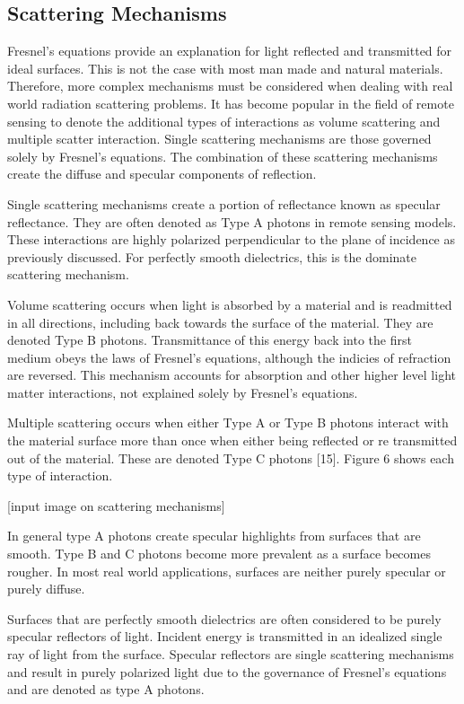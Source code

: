 \subsection{Scattering Mechanisms}

Fresnel’s equations provide an explanation for light reflected and transmitted for ideal surfaces.  This is not the case with most man made and natural materials.  Therefore, more complex mechanisms must be considered when dealing with real world radiation scattering problems.  It has become popular in the field of remote sensing to denote the additional types of interactions as volume scattering and multiple scatter interaction.  Single scattering mechanisms are those governed solely by Fresnel’s equations.  The combination of these scattering mechanisms create the diffuse and specular components of reflection.

Single scattering mechanisms create a portion of reflectance known as specular reflectance.  They are often denoted as Type A photons in remote sensing models.  These interactions are highly polarized perpendicular to the plane of incidence as previously discussed. For perfectly smooth dielectrics, this is the dominate scattering mechanism.

Volume scattering occurs when light is absorbed by a material and is readmitted in all directions, including back towards the surface of the material.  They are denoted Type B photons.  Transmittance of this energy back into the first medium obeys the laws of Fresnel’s equations, although the indicies of refraction are reversed.  This mechanism accounts for absorption and other higher level light matter interactions, not explained solely by Fresnel’s equations.

Multiple scattering occurs when either Type A or Type B photons interact with the material surface more than once when either being reflected or re transmitted out of the material.  These are denoted Type C photons [15].  Figure 6 shows each type of interaction.

[input image on scattering mechanisms]

In general type A photons create specular highlights from surfaces that are smooth.  Type B and C photons become more prevalent as a surface becomes rougher.  In most real world applications, surfaces are neither purely specular or purely diffuse.

Surfaces that are perfectly smooth dielectrics are often considered to be purely specular reflectors of light.  Incident energy is transmitted in an idealized single ray of light from the surface.  Specular reflectors are single scattering mechanisms and result in purely polarized light due to the governance of Fresnel’s equations and are denoted as type A photons.

